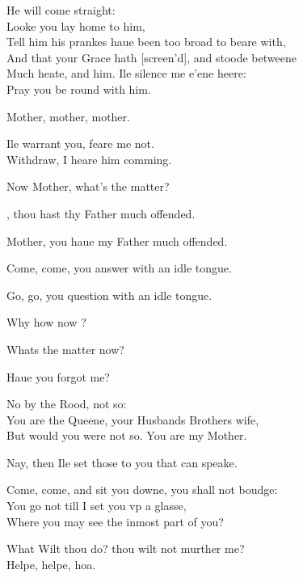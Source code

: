 \documentclass[a5paper,DIV=calc,11pt]{scrbook}
\newcommand{\updatemarks}{\markboth{Act \Roman{act}}{Scene \Roman{act}--\Roman{scene}}}
\begin{document}
\scene

\updatemarks


\begin{drama*}
    \polspeaks He will come straight:\\
    Looke you lay home to him,\\
    Tell him his prankes haue been too broad to beare with,\\
    And that your Grace hath [screen'd], and stoode betweene\\
    Much heate, and him. Ile silence me e'ene heere:\\
    Pray you be round with him.
    
     Mother, mother, mother.
    
    \queenspeaks Ile warrant you, feare me not.\\
    Withdraw, I heare him comming.
    
    
    \hamspeaks Now Mother, what's the matter?
    
    \queenspeaks \ham, thou hast thy Father much offended.
    
    \hamspeaks Mother, you haue my Father much offended.
    
    \queenspeaks Come, come, you answer with an idle tongue.
    
    \hamspeaks Go, go, you question with an idle tongue.
    
    \queenspeaks Why how now \ham?
    
    \hamspeaks Whats the matter now?
    
    \queenspeaks Haue you forgot me?
    
    \hamspeaks No by the Rood, not so:\\
    You are the Queene, your Husbands Brothers wife,\\
    But would you were not so. You are my Mother.
    
    \queenspeaks Nay, then Ile set those to you that can speake.
    
    \hamspeaks Come, come, and sit you downe, you shall not boudge:\\
    You go not till I set you vp a glasse,\\
    Where you may see the inmost part of you?
    
    \queenspeaks What Wilt thou do? thou wilt not murther me?\\
    Helpe, helpe, hoa.
    

\end{drama*}
\end{document}
